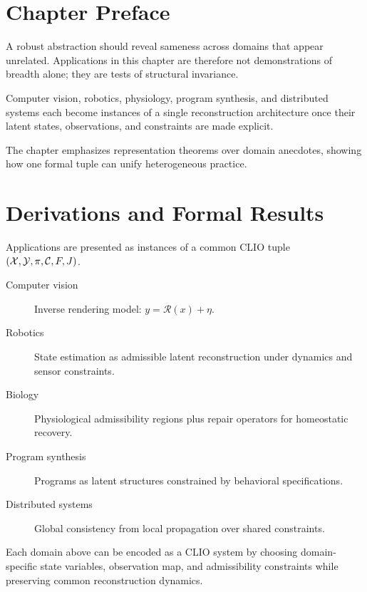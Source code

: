 \section{Chapter Preface}
A robust abstraction should reveal sameness across domains that appear unrelated. Applications in this chapter are therefore not demonstrations of breadth alone; they are tests of structural invariance.

Computer vision, robotics, physiology, program synthesis, and distributed systems each become instances of a single reconstruction architecture once their latent states, observations, and constraints are made explicit.

The chapter emphasizes representation theorems over domain anecdotes, showing how one formal tuple can unify heterogeneous practice.

\section{Derivations and Formal Results}
Applications are presented as instances of a common CLIO tuple \((\mathcal{X},\mathcal{Y},\pi,\mathcal{C},F,J)\).

\begin{description}
  \item[Computer vision] Inverse rendering model: \(y=\mathcal R(x)+\eta\).
  \item[Robotics] State estimation as admissible latent reconstruction under dynamics and sensor constraints.
  \item[Biology] Physiological admissibility regions plus repair operators for homeostatic recovery.
  \item[Program synthesis] Programs as latent structures constrained by behavioral specifications.
  \item[Distributed systems] Global consistency from local propagation over shared constraints.
\end{description}

\begin{theorem}
Each domain above can be encoded as a CLIO system by choosing domain-specific state variables, observation map, and admissibility constraints while preserving common reconstruction dynamics.
\end{theorem}
